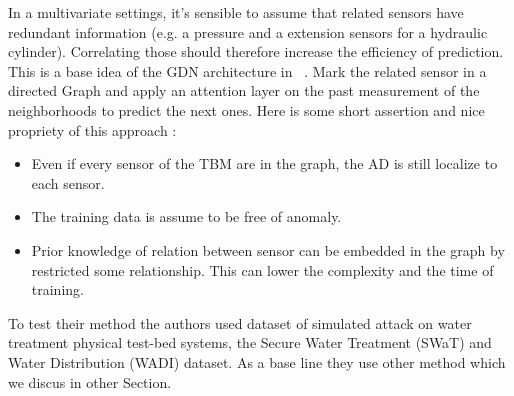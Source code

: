 \documentclass[../description.tex]{subfiles}
\begin{document}
    In a multivariate settings, it's sensible to assume that related sensors have redundant information 
    (e.g. a pressure and a extension sensors for a hydraulic cylinder).
    Correlating those should therefore increase the efficiency of prediction. 
    This is a base idea of the GDN architecture in ~\cite{Deng.2021}. Mark the related sensor in a directed Graph
    and apply an attention layer on the past measurement of the neighborhoods to predict the next ones.
    Here is some short assertion and nice propriety of this approach :
    \begin{itemize}
        \item Even if every sensor of the TBM are in the graph, the AD is still localize to each sensor.
        \item The training data is assume to be free of anomaly.
        \item Prior knowledge of relation between sensor can be embedded in the graph by restricted some relationship. 
        This can lower the complexity and the time of training.
    \end{itemize}

    To test their method the authors used dataset of simulated attack on water treatment physical test-bed systems, 
    the Secure Water Treatment (SWaT) and Water Distribution (WADI) dataset. As a base line they use other method which we discus in other Section.
    
\end{document}
